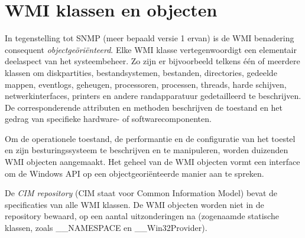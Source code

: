 \documentclass[11pt,a4paper]{report}
\begin{document}
\section{WMI klassen en objecten}
In tegenstelling tot SNMP (meer bepaald versie 1 ervan) is de WMI benadering consequent \textit{objectgeöriënteerd}. Elke WMI klasse vertegenwoordigt een elementair deelaspect van het systeembeheer. Zo zijn er bijvoorbeeld telkens één of meerdere klassen om diskpartities, bestandsystemen, bestanden, directories, gedeelde mappen, eventlogs, geheugen, processoren, processen, threads, harde schijven, netwerkinterfaces, printers en andere randapparatuur gedetailleerd te beschrijven. De corresponderende attributen en methoden beschrijven de toestand en het gedrag van specifieke hardware- of softwarecomponenten.
\par Om de operationele toestand, de performantie en de configuratie van het toestel en zijn besturingssysteem te beschrijven en te manipuleren, worden duizenden WMI objecten aangemaakt. Het geheel van de WMI objecten vormt een interface om de Windows API op een objectgeoriënteerde manier aan te spreken.
\par De \textit{CIM repository} (CIM staat voor Common Information Model) bevat de specificaties van alle WMI klassen. De WMI objecten worden niet in de repository bewaard, op een aantal uitzonderingen na (zogenaamde statische klassen, zoals \_\_NAMESPACE en \_\_Win32Provider).
\end{document}
